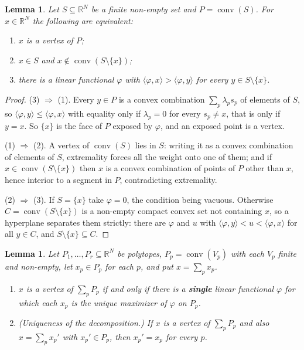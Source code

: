 \documentclass[11pt, a4paper, abstract=yes]{scrartcl}
\theoremstyle{definition}
\theoremstyle{remark}
\theoremstyle{plain}
\newtheorem{lemma}[definition]{Lemma}
\newcommand{\leandiscof}[1]{\tikz[baseline=-0.6ex]\fill[#1] (0,0) circle (0.6ex);}
\newcommand{\leanfull}{\leandiscof{leanfull}}
\newcommand{\leanpartial}{\tikz[baseline=-0.6ex]{\fill[leanfull] (0,-0.6ex) arc (-90:90:0.6ex) -- cycle;\draw[leanfull,line width=0.5pt] (0,0) circle (0.6ex);}}
\newcommand{\leanmark}[1]{\leavevmode{\reversemarginpar\marginnote{\raggedleft#1}}}
\newcommand{\conv}{\operatorname{conv}}
\begin{document}
\begin{lemma}
\leanmark{\leanfull}Let \(S\subseteq\mathbb R^N\) be a finite non-empty set and \(P=\conv(S)\). For \(x\in\mathbb R^N\)
the following are equivalent:
\begin{enumerate}
\item \(x\) is a vertex of \(P\);
\item \(x\in S\) and \(x\notin\conv(S\setminus\lbrace x\rbrace)\);
\item there is a linear functional \(\varphi\) with \(\langle\varphi,x\rangle>\langle\varphi,y\rangle\)
for every \(y\in S\setminus\lbrace x\rbrace\).
\end{enumerate}
\label{lem:exposed-vertex}
\label{lem-exposed-vertex}
\end{lemma}

\begin{proof}
(3) \(\Rightarrow\) (1). Every \(y\in P\) is a convex combination \(\sum_p\lambda_ps_p\) of elements
of \(S\), so \(\langle\varphi,y\rangle\le\langle\varphi,x\rangle\) with equality only if
\(\lambda_p=0\) for every \(s_p\ne x\), that is only if \(y=x\). So \(\lbrace x\rbrace\) is the face
of \(P\) exposed by \(\varphi\), and an exposed point is a vertex.

(1) \(\Rightarrow\) (2). A vertex of \(\conv(S)\) lies in \(S\): writing it as a convex combination
of elements of \(S\), extremality forces all the weight onto one of them; and if
\(x\in\conv(S\setminus\lbrace x\rbrace)\) then \(x\) is a convex combination of points of \(P\) other
than \(x\), hence interior to a segment in \(P\), contradicting extremality.

(2) \(\Rightarrow\) (3). If \(S=\lbrace x\rbrace\) take \(\varphi=0\), the condition being vacuous.
Otherwise \(C=\conv(S\setminus\lbrace x\rbrace)\) is a non-empty compact convex set not containing
\(x\), so a hyperplane separates them strictly: there are \(\varphi\) and \(u\) with
\(\langle\varphi,y\rangle<u<\langle\varphi,x\rangle\) for all \(y\in C\), and
\(S\setminus\lbrace x\rbrace\subseteq C\).
\end{proof}

\begin{lemma}
\leanmark{\leanpartial}Let \(P_1,\dots,P_r\subseteq\mathbb R^N\) be polytopes, \(P_p=\conv(V_p)\) with each \(V_p\)
finite and non-empty, let \(x_p\in P_p\) for each \(p\), and put \(x=\sum_px_p\).
\begin{enumerate}
\item \(x\) is a vertex of \(\sum_pP_p\) if and only if there is a \textbf{single} linear functional
\(\varphi\) for which each \(x_p\) is the \emph{unique} maximizer of \(\varphi\) on \(P_p\).
\item \emph{(Uniqueness of the decomposition.)} If \(x\) is a vertex of \(\sum_pP_p\) and also
\(x=\sum_px_p'\) with \(x_p'\in P_p\), then \(x_p'=x_p\) for every \(p\).
\end{enumerate}
\label{lem:vertexdecomp}
\label{lem-vertexdecomp}
\end{lemma}
\end{document}
